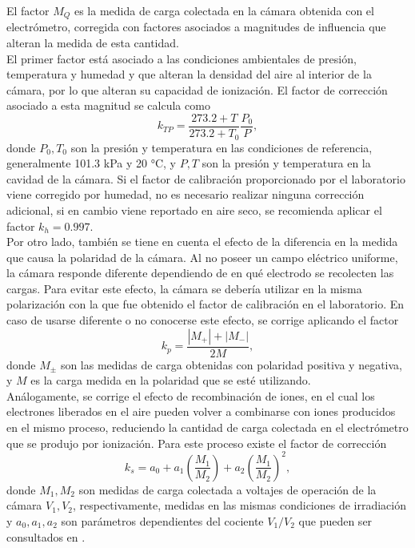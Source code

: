 El factor $M_{Q}$ es la medida de carga colectada en la cámara obtenida con el electrómetro, corregida con factores asociados a  magnitudes de influencia que alteran la medida de esta cantidad.\\

El primer factor está asociado a las condiciones ambientales de presión, temperatura y humedad y que alteran la densidad del aire al interior de la cámara, por lo que alteran su capacidad de ionización. El factor de corrección asociado a esta magnitud se calcula como 
\begin{equation}
	k_{TP}=\frac{273.2+T}{273.2+T_0}\frac{P_0}{P},
\end{equation}
donde $P_0,T_0$ son la presión y temperatura en las condiciones de referencia, generalmente 101.3 kPa y 20 °C, y $P,T$ son la presión y temperatura en la cavidad de la cámara. Si el factor de calibración proporcionado por el laboratorio viene corregido por humedad, no es necesario realizar ninguna corrección adicional, si en cambio viene reportado en aire seco, se recomienda aplicar el factor $k_{h}=0.997$.\\

Por otro lado, también se tiene en cuenta el efecto de la diferencia en la medida que causa la polaridad de la cámara. Al no poseer un campo eléctrico uniforme, la cámara responde diferente dependiendo de en qué electrodo se recolecten las cargas. Para evitar este efecto, la cámara se debería utilizar en la misma polarización con la que fue obtenido el factor de calibración en el laboratorio. En caso de usarse diferente o no conocerse este efecto, se corrige aplicando el factor
\begin{equation}
	k_{p}=\frac{|M_{+}|+|M_{-}|}{2M},
\end{equation}
donde $M_{\pm}$ son las medidas de carga obtenidas con polaridad positiva y negativa, y $M$ es la carga medida en la polaridad que se esté utilizando.\\

Análogamente, se corrige el efecto de recombinación de iones, en el cual los electrones liberados en el aire pueden volver a combinarse con iones producidos en el mismo proceso, reduciendo la cantidad de carga colectada en el electrómetro que se produjo por ionización. Para este proceso existe el factor de corrección
\begin{equation}
	k_s=a_0+a_1\left(\frac{M_1}{M_2}\right)+a_2\left(\frac{M_1}{M_2}\right)^2,
\end{equation}  
donde $M_1,M_2$ son medidas de carga colectada a voltajes de operación de la cámara  $V_1,V_2$, respectivamente, medidas en las mismas condiciones de irradiación y $a_0,a_1,a_2$ son parámetros dependientes del cociente $V_1/V_2$ que pueden ser consultados en \cite{TPR398}.\\

